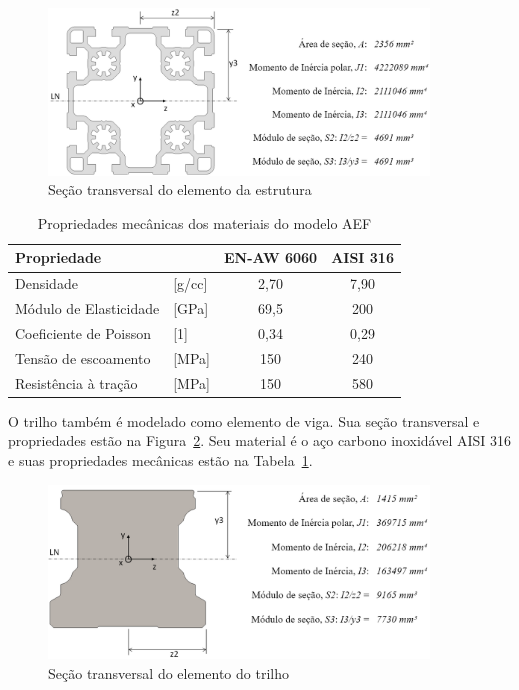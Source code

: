 \begin{figure}[h]
	\centering 
 	\includegraphics[width=0.90\textwidth]{figs/sectrans_bosch}
 	\caption{Seção transversal do elemento da estrutura}
 	\label{fig::sectrans_bosch}
\end{figure}

\begin{table}
\centering
\caption{Propriedades mecânicas dos materiais do modelo AEF}
\label{tab::prop_mat}
\begin{tabular}{@{}llcc@{}}
\toprule
\textbf{Propriedade}   &             & \textbf{EN-AW 6060} & \textbf{AISI 316} \\ \midrule
Densidade              & {[}g/cc{]}  & 2,70                & 7,90             \\
Módulo de Elasticidade & {[}GPa{]}   & 69,5                & 200               \\
Coeficiente de Poisson & {[}1{]}     & 0,34                & 0,29    			\\
Tensão de escoamento   & {[}MPa{]}   & 150                 & 240               \\
Resistência à tração   & {[}MPa{]}   & 150                 & 580               \\ \bottomrule
\end{tabular}
\end{table}

O trilho também é modelado como elemento de viga. Sua seção transversal e
propriedades estão na Figura~\ref{fig::sectran_trilho}. Seu material é o aço
carbono inoxidável AISI 316 e suas propriedades mecânicas estão na
Tabela~\ref{tab::prop_mat}.

\begin{figure}[h]
	\centering 
 	\includegraphics[width=0.90\textwidth]{figs/sectran_trilho}
 	\caption{Seção transversal do elemento do trilho}
 	\label{fig::sectran_trilho}
\end{figure}

